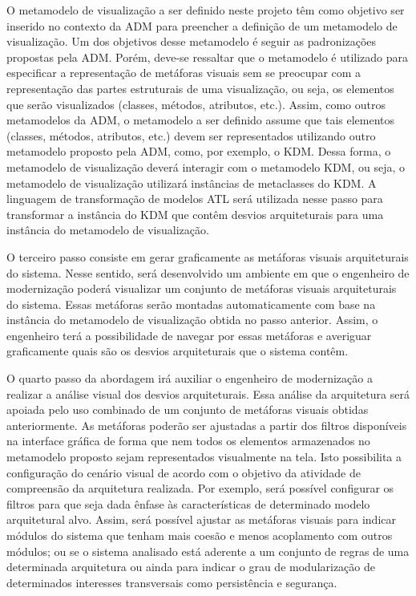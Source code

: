 \documentclass[12pt]{article}
\begin{document}
O metamodelo de visualização a ser definido neste projeto têm como objetivo ser inserido no contexto da ADM para preencher a definição de um metamodelo de visualização. Um dos objetivos desse metamodelo é seguir as padronizações propostas pela ADM. Porém, deve-se ressaltar que o metamodelo é utilizado para especificar a representação de metáforas visuais sem se preocupar com a representação das partes estruturais de uma visualização, ou seja, os elementos que serão visualizados (classes, métodos, atributos, etc.). Assim, como outros metamodelos da ADM, o metamodelo a ser definido assume que tais elementos (classes, métodos, atributos, etc.) devem ser representados utilizando outro metamodelo proposto pela ADM, como, por exemplo, o KDM. Dessa forma, o metamodelo de visualização deverá interagir com o metamodelo KDM, ou seja, o metamodelo de visualização utilizará instâncias de metaclasses do KDM. A linguagem de transformação de modelos ATL será utilizada nesse passo para transformar a instância do KDM que contêm desvios arquiteturais para uma instância do metamodelo de visualização. 

O terceiro passo consiste em gerar graficamente as metáforas visuais arquiteturais do sistema. Nesse sentido, será desenvolvido um ambiente em que o engenheiro de modernização poderá visualizar um conjunto de metáforas visuais arquiteturais do sistema. Essas metáforas serão montadas automaticamente com base na instância do metamodelo de visualização obtida no passo anterior. Assim, o engenheiro terá a possibilidade de navegar por essas metáforas e averiguar graficamente quais são os desvios arquiteturais que o sistema contêm.

O quarto passo da abordagem irá auxiliar o engenheiro de modernização a realizar a análise visual dos desvios arquiteturais. Essa análise da arquitetura será apoiada pelo uso combinado de um conjunto de metáforas visuais obtidas anteriormente. As metáforas poderão ser ajustadas a partir dos filtros disponíveis na interface gráfica de forma que nem todos os elementos armazenados no metamodelo proposto sejam representados visualmente na tela. Isto possibilita a configuração do cenário visual de acordo com o objetivo da atividade de compreensão da arquitetura realizada. Por exemplo, será possível configurar os filtros para que seja dada ênfase às características de determinado modelo arquitetural alvo. Assim, será possível ajustar as metáforas visuais para indicar módulos do sistema que tenham mais coesão e menos acoplamento com outros módulos; ou se o sistema analisado está aderente a um conjunto de regras de uma determinada arquitetura ou ainda para indicar o grau de modularização de determinados interesses transversais como persistência e segurança.
\end{document}
